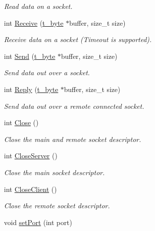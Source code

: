 \begin{DoxyCompactItemize}
\begin{DoxyCompactList}\small\item\em Read data on a socket. \end{DoxyCompactList}\item 
int \hyperlink{classSocket_a96ca161ecfaa38d2384141f131a0e41a}{Receive} (\hyperlink{util_8h_af1d862c52e0c84cc223f106956ac8543}{t\+\_\+byte} $\ast$buffer, size\+\_\+t size)
\begin{DoxyCompactList}\small\item\em Receive data on a socket (Timeout is supported). \end{DoxyCompactList}\item 
int \hyperlink{classSocket_a9fbcd665edfd9cdaae25aeb6fcb5a2eb}{Send} (\hyperlink{util_8h_af1d862c52e0c84cc223f106956ac8543}{t\+\_\+byte} $\ast$buffer, size\+\_\+t size)
\begin{DoxyCompactList}\small\item\em Send data out over a socket. \end{DoxyCompactList}\item 
int \hyperlink{classSocket_ad9e6717ab6d79f3805d05f839ee4b902}{Reply} (\hyperlink{util_8h_af1d862c52e0c84cc223f106956ac8543}{t\+\_\+byte} $\ast$buffer, size\+\_\+t size)
\begin{DoxyCompactList}\small\item\em Send data out over a remote connected socket. \end{DoxyCompactList}\item 
int \hyperlink{classSocket_af54cb0772fa8cbce304c26cab4a63ad7}{Close} ()
\begin{DoxyCompactList}\small\item\em Close the main and remote socket descriptor. \end{DoxyCompactList}\item 
int \hyperlink{classSocket_af6d09bbd69b9978f90c2d21be7c04820}{Close\+Server} ()
\begin{DoxyCompactList}\small\item\em Close the main socket descriptor. \end{DoxyCompactList}\item 
int \hyperlink{classSocket_a97248bd978b2212d0a78577d1b264cd3}{Close\+Client} ()
\begin{DoxyCompactList}\small\item\em Close the remote socket descriptor. \end{DoxyCompactList}\item 
void \hyperlink{classSocket_a3d4c5d2c8722949bbd72a9d453edc94f}{set\+Port} (int port)

\end{DoxyCompactItemize}

